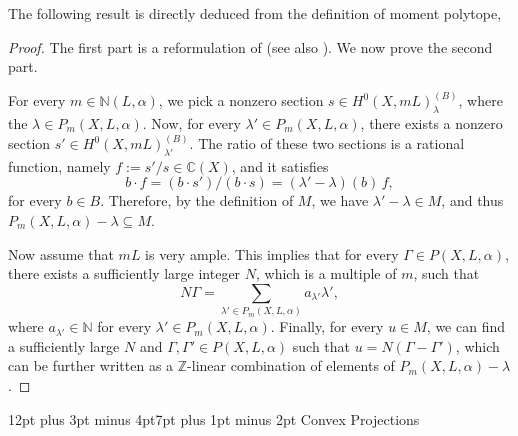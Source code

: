\documentclass[11pt, oneside]{amsart}
\makeatletter
\newtheorem{lemma}[theorem]{Lemma}
\newcommand{\<}{\left\langle} \renewcommand{\>}{\right\rangle}
\renewcommand{\subsection}{\@startsection{subsection}{2}{\z@}%
  {12pt plus 3pt minus 4pt}{7pt plus 1pt minus 2pt}%
  {\normalfont\bfseries}}
\let\oldsum\sum
\renewcommand{\sum}{\oldsum\limits}
\makeatother
\begin{document}
The following result is directly deduced from the definition of moment polytope, 

\begin{proof}
	The first part is a reformulation of \cite[\S1.2, Proposition 3]{Brion_var_sph} (see also \cite[Lemma 2.21 (ii)]{Brion_intro_act_alg_grp}). We now prove the second part.

	For every $m \in \mathbb{N}(L, \alpha)$, we pick a nonzero section
	$s \in H^0(X, mL)^{(B)}_\lambda$, where the $\lambda \in P_m(X, L, \alpha)$. Now, for every
	$\lambda' \in P_m(X, L, \alpha)$, there exists a nonzero section
	$s' \in H^0(X, mL)^{(B)}_{\lambda'}$.
	The ratio of these two sections is a rational function, namely
	$f := s' / s \in \mathbb{C}(X)$, and it satisfies
	\begin{equation*}
		b \cdot f = (b \cdot s') / (b \cdot s)
		= (\lambda' - \lambda)(b)\, f,
	\end{equation*}
	for every $b \in B$. Therefore, by the definition of $M$, we have
	$\lambda' - \lambda \in M$, and thus
	$P_m(X, L, \alpha) - \lambda \subseteq M$.

	Now assume that $mL$ is very ample. This implies that for every
	$\Gamma \in P(X, L, \alpha)$, there exists a sufficiently large integer
	$N$, which is a multiple of $m$, such that
	\begin{equation*}
		N \Gamma = \sum_{{\lambda'} \in P_m(X, L, \alpha)} a_{\lambda'} {\lambda'},
	\end{equation*}
	where $a_{\lambda'} \in \mathbb{N}$ for every
	${\lambda'} \in P_m(X, L, \alpha)$.
	Finally, for every $u \in M$, we can find a sufficiently large $N$
	and $\Gamma, \Gamma' \in P(X, L, \alpha)$ such that
	$u = N(\Gamma - \Gamma')$, which can be further written as a
	$\mathbb{Z}$-linear combination of elements of
	$P_m(X, L, \alpha) - \lambda$.
\end{proof}


\subsection{Convex Projections}\label{sec:Qls:proj}
\end{document}
